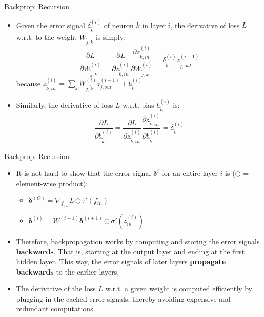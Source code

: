 \documentclass[11pt,compress,t,notes=noshow, xcolor=table]{beamer}
\begin{document}
\begin{frame} {Backprop: Recursion}
  \begin{itemize}
    \item Given the error signal $\delta_{\tilde{k}}^{(i)}$ of neuron $\tilde{k}$ in layer $i$, the derivative of loss $L$ w.r.t. to the weight $W_{\tilde{j},\tilde{k}}$ is simply:
        $$
           \frac{\partial L}{\partial W_{\tilde{j},\tilde{k}}^{(i)}} = \frac{\partial L}{\partial z_{\tilde{k},in}^{(i)}} \frac{\partial z_{\tilde{k},in}^{(i)}}{\partial W_{\tilde{j},\tilde{k}}^{(i)}} 
           = \delta_{\tilde{k}}^{(i)} z_{\tilde{j},out}^{(i-1)} $$
        because $z_{\tilde{k},in}^{(i)} = \sum_j W_{j,\tilde{k}}^{(i)}z_{j,out}^{(i-1)}  + b_{\tilde{k}}^{(i)}$
    \item Similarly, the derivative of loss $L$ w.r.t. bias $b_{\tilde{k}}^{(i)}$ is:
      $$ \frac{\partial L}{\partial b_{\tilde{k}}^{(i)}} = \frac{\partial L}{\partial z_{\tilde{k},in}^{(i)}} \frac{\partial z_{\tilde{k},in}^{(i)}}{\partial b_{\tilde{k}}^{(i)}} = \delta_{\tilde{k}}^{(i)}$$
  \end{itemize}
\end{frame}

\begin{frame} {Backprop: Recursion}
\begin{itemize}
\item It is not hard to show that the error signal $\bm{\delta}^{i}$ for an entire layer $i$ is ($\odot$ = element-wise product):
\begin{itemize}
\item $\bm{\delta}^{(O)} = \nabla_{f_{out}}L \odot \tau'(f_{in})$
\item $\bm{\delta}^{(i)} = W^{(i+1)}\bm{\delta}^{(i+1)} \odot \sigma'(z_{in}^{(i)})$
\end{itemize}
\item Therefore, backpropagation works by computing and storing the error signals \textbf{backwards}. That is, starting at the output layer and ending at the first hidden layer. This way, the error signals of later layers \textbf{propagate backwards} to the earlier layers.
\item The derivative of the loss $L$ w.r.t. a given weight is computed efficiently by plugging in the cached error signals, thereby avoiding expensive and redundant computations. 
\end{itemize}
\end{frame}
\end{document}
